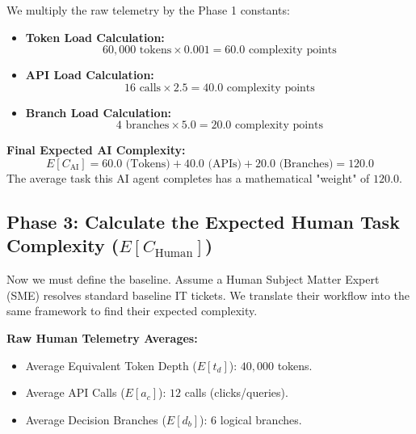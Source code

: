 \documentclass[11pt,a4paper]{article}
\begin{document}
\begin{tcolorbox}[enhanced, colback=dpicloud!5!white, colframe=dpigreen, title={\textbf{Phase 2: Step-by-Step AI Arithmetic}}, fonttitle=\bfseries]
We multiply the raw telemetry by the Phase 1 constants:
\vspace{0.2cm}
\begin{itemize}
    \item \textbf{Token Load Calculation:} 
    \[ 60,000 \text{ tokens} \times 0.001 = \mathbf{60.0} \text{ complexity points} \]
    \item \textbf{API Load Calculation:} 
    \[ 16 \text{ calls} \times 2.5 = \mathbf{40.0} \text{ complexity points} \]
    \item \textbf{Branch Load Calculation:} 
    \[ 4 \text{ branches} \times 5.0 = \mathbf{20.0} \text{ complexity points} \]
\end{itemize}

\vspace{0.2cm}
\textbf{Final Expected AI Complexity:}
\[
E[C_{\text{AI}}] = 60.0 \text{ (Tokens)} + 40.0 \text{ (APIs)} + 20.0 \text{ (Branches)} = \mathbf{120.0}
\]
The average task this AI agent completes has a mathematical "weight" of $120.0$.
\end{tcolorbox}

\newpage

\subsection{Phase 3: Calculate the Expected Human Task Complexity ($E[C_{\text{Human}}]$)}

Now we must define the baseline. Assume a Human Subject Matter Expert (SME) resolves standard baseline IT tickets. We translate their workflow into the same framework to find their expected complexity.

\vspace{0.3cm}
\textbf{Raw Human Telemetry Averages:}
\begin{itemize}
    \item Average Equivalent Token Depth ($E[t_d]$): $40,000$ tokens.
    \item Average API Calls ($E[a_c]$): $12$ calls (clicks/queries).
    \item Average Decision Branches ($E[d_b]$): $6$ logical branches.
\end{itemize}
\end{document}
